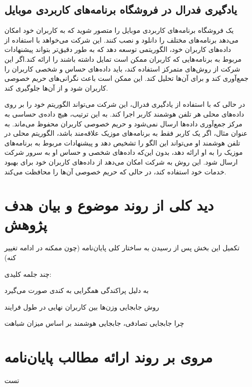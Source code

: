 \subsection{یادگیری فدرال در فروشگاه برنامه‌های کاربردی موبایل}
یک فروشگاه برنامه‌های کاربردی%
موبایل را متصور شوید که به کاربران خود امکان می‌دهد برنامه‌های مختلف را دانلود و نصب کنند. این شرکت می‌خواهد با استفاده از داده‌های کاربران خود، الگوریتمی توسعه دهد که به طور دقیق‌تر بتواند پیشنهادات مربوط به برنامه‌هایی که کاربران ممکن است تمایل داشته باشند را ارائه کند.اگر این شرکت از روش‌های متمرکز استفاده کند، باید داده‌های حساس و شخصی کاربران را جمع‌آوری کند و برای آن‌ها تحلیل کند. این ممکن است باعث نگرانی‌های حریم خصوصی کاربران شود و از آن‌ها جلوگیری کند.

در حالی که با استفاده از یادگیری فدرال، این شرکت می‌تواند الگوریتم خود را بر روی داده‌های محلی هر تلفن هوشمند کاربر اجرا کند. به این ترتیب، هیچ داده‌ی حساسی به مرکز جمع‌آوری داده‌ها ارسال نمی‌شود و حریم خصوصی کاربران محفوظ می‌ماند. به عنوان مثال، اگر یک کاربر فقط به برنامه‌های موزیک علاقه‌مند باشد، الگوریتم محلی در تلفن هوشمند او می‌تواند این الگو را تشخیص دهد و پیشنهادات مربوط به برنامه‌های موزیک را به او ارائه دهد، بدون این‌که داده‌های شخصی و حساس او به سرور شرکت ارسال شود. این روش به شرکت امکان می‌دهد از داده‌های کاربران خود برای بهبود خدمات خود استفاده کند، در حالی که حریم خصوصی آن‌ها را محافظت می‌کند.


\section{دید کلی از روند موضوع و بیان هدف پژوهش}
تکمیل این بخش پس از رسیدن به ساختار کلی پایان‌نامه (چون ممکنه در ادامه تغییر کنه)

چند جلمه کلیدی:

به دلیل پراکندگی همگرایی به کندی صورت می‌گیرد

روش جابجایی وزن‌ها بین کاربران نهایی در طول فرایند

چرا جابجایی تصادفی، جابجایی هوشمند بر اساس میزان شباهت

\section{مروی بر روند ارائه مطالب پایان‌نامه}
تست

